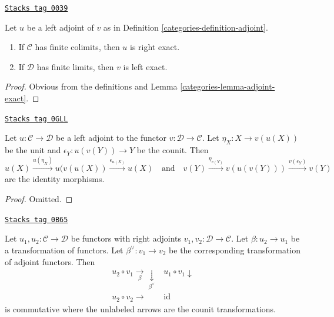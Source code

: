 \begin{lemma}
\label{categories-lemma-exact-adjoint}
\href{https://stacks.math.columbia.edu/tag/0039}{\texttt{Stacks tag 0039}}

Let $u$ be a left adjoint of $v$ as in Definition \ref{categories-definition-adjoint}.
\begin{enumerate}
\item If $\mathcal{C}$ has finite colimits, then $u$ is right exact.
\item If $\mathcal{D}$ has finite limits, then $v$ is left exact.
\end{enumerate}
\end{lemma}

\begin{proof}

Obvious from the definitions and Lemma \ref{categories-lemma-adjoint-exact}.
\end{proof}

\begin{lemma}
\label{categories-lemma-unit-counit-relations}
\href{https://stacks.math.columbia.edu/tag/0GLL}{\texttt{Stacks tag 0GLL}}

Let $u : \mathcal{C} \to \mathcal{D}$ be a left adjoint to the functor
$v : \mathcal{D} \to \mathcal{C}$. Let $\eta_X : X \to v(u(X))$ be the unit
and $\epsilon_Y : u(v(Y)) \to Y$ be the counit. Then
$$
u(X) \xrightarrow{u(\eta_X)} u(v(u(X))
\xrightarrow{\epsilon_{u(X)}} u(X)
\quad\text{and}\quad
v(Y) \xrightarrow{\eta_{v(Y)}} v(u(v(Y))) \xrightarrow{v(\epsilon_Y)}
v(Y)
$$
are the identity morphisms.
\end{lemma}

\begin{proof}
Omitted.
\end{proof}

\begin{lemma}
\label{categories-lemma-transformation-between-functors-and-adjoints}
\href{https://stacks.math.columbia.edu/tag/0B65}{\texttt{Stacks tag 0B65}}

Let $u_1, u_2 : \mathcal{C} \to \mathcal{D}$ be functors with right
adjoints $v_1, v_2 : \mathcal{D} \to \mathcal{C}$. Let $\beta : u_2 \to u_1$
be a transformation of functors. Let $\beta^\vee : v_1 \to v_2$ be
the corresponding transformation of adjoint functors. Then
$$
\begin{array}{cc}u_2 \circ v_1 \underset{\beta}{\longrightarrow}\underset{\beta^\vee}{\downarrow} & u_1 \circ v_1 \downarrow \\ u_2 \circ v_2 \longrightarrow & \text{id}\end{array}
$$
is commutative where the unlabeled arrows are the counit transformations.
\end{lemma}

